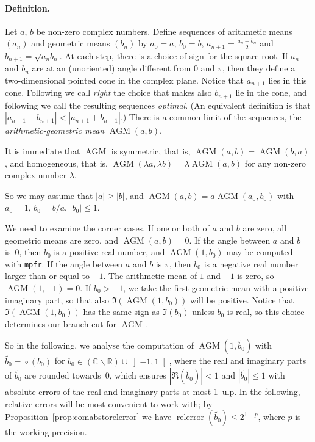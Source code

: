 \documentclass [11pt]{article}
\newcommand {\corr}[1]{{#1}}
\newcommand {\appro}[1]{\widetilde {#1}}
\newcommand {\mpfr}{{\tt mpfr}}
\newcommand {\ulp}[1]{#1~ulp}
\newcommand{\relerror}{\operatorname {relerror}}
\newcommand {\round}{\operatorname {\circ}}
\newcommand {\R}{\mathbb R}
\newcommand {\C}{\mathbb C}
\renewcommand {\leq}{\leqslant}
\renewcommand {\geq}{\geqslant}
\newcommand {\AGM}{\operatorname{AGM}}
\begin{document}
\paragraph {Definition.}
Let $a$, $b$ be non-zero complex numbers.
Define sequences of arithmetic means $(a_n)$
and geometric means $(b_n)$
by $\corr {a_0} = a$, $\corr {b_0} = b$,
$\corr {a_{n+1}} = \frac {\corr {a_n} + \corr {b_n}}{2}$ and
$\corr {b_{n+1}} = \sqrt {\corr {a_n} \corr {b_n}}$.
At each step, there is a choice of sign for the square root.
If $\corr {a_n}$ and $\corr {b_n}$ are at an (unoriented) angle
different from $0$ and $\pi$, then
they define a two-dimensional pointed cone in the complex plane.
Notice that $\corr {a_{n+1}}$ lies in this cone.
Following \cite {Cox84} we call \emph {right} the choice that makes
also $\corr {b_{n+1}}$ lie in the cone, and following \cite {CrTh13}
we call the resulting sequences \emph {optimal}.
(An equivalent definition is that $|a_{n+1} - b_{n+1}| < |a_{n+1} + b_{n+1}|$.)
There is a common limit of the sequences, the
\emph {arithmetic-geometric mean}
$\AGM (a, b)$.

It is immediate that $\AGM$ is symmetric, that is,
$\AGM (a, b) = \AGM (b, a)$, and homogeneous, that is,
$\AGM (\lambda a, \lambda b) = \lambda \AGM (a, b)$ for any non-zero
complex number $\lambda$.

So we may assume that $|a| \geq |b|$, and
$\AGM (a, b) = a \AGM (a_0, b_0)$
with $\corr {a_0} = 1$, $\corr {b_0} = b/a$, $|\corr {b_0}| \leq 1$.

We need to examine the corner cases.
If one or both of $a$ and $b$ are zero, all geometric means are zero,
and $\AGM (a, b) = 0$.
If the angle between $a$ and $b$ is~$0$, then $\corr {b_0}$ is a positive real
number, and $\AGM (1, \corr {b_0})$ may be computed with \mpfr.
If the angle between $a$ and $b$ is $\pi$, then $\corr {b_0}$ is a negative real
number larger than or equal to $-1$. The arithmetic mean of $1$ and $-1$
is zero, so $\AGM (1, -1) = 0$.
If $\corr {b_0} > -1$, we take the first geometric mean with a positive imaginary
part, so that also $\Im (\AGM (1, \corr {b_0}))$ will be positive.
Notice that $\Im (\AGM (1, \corr {b_0}))$ has the same sign as
$\Im (\corr {b_0})$ unless
$\corr {b_0}$ is real, so this choice determines our branch cut for $\AGM$.

So in the following, we analyse the computation of $\AGM (1, \appro {b_0})$
with
$\appro {b_0} = \round (\corr {b_0})$
for $b_0 \in (\C \backslash \R) \cup \left] -1, 1 \right[$,
where the real and imaginary parts of $\appro {b_0}$ are rounded
towards~$0$,
which ensures $\left| \Re (\appro {b_0}) \right| < 1$
and $| \appro {b_0} | \leq 1$
with absolute errors of the real and imaginary parts at most \ulp {1}.
In the following, relative errors will be most convenient to work with;
by Proposition~\ref {prop:comabstorelerror} we have
$\relerror (\appro {b_0}) \leq 2^{1-p}$, where $p$ is the working precision.
\end{document}
